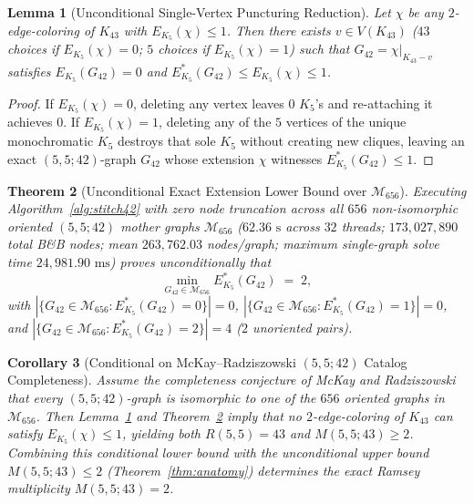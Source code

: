 \documentclass[11pt,a4paper]{article}
\theoremstyle{plain}
\newtheorem{theorem}{Theorem}[section]
\newtheorem{lemma}[theorem]{Lemma}
\newtheorem{corollary}[theorem]{Corollary}
\theoremstyle{definition}
\begin{document}
\begin{lemma}[Unconditional Single-Vertex Puncturing Reduction]\label{lem:puncture}
Let $\chi$ be any $2$-edge-coloring of $K_{43}$ with $E_{K_5}(\chi) \le 1$. Then there exists $v \in V(K_{43})$ ($43$ choices if $E_{K_5}(\chi) = 0$; $5$ choices if $E_{K_5}(\chi) = 1$) such that $G_{42} = \chi|_{K_{43} - v}$ satisfies $E_{K_5}(G_{42}) = 0$ and $E_{K_5}^*(G_{42}) \le E_{K_5}(\chi) \le 1$.
\end{lemma}
\begin{proof}
If $E_{K_5}(\chi) = 0$, deleting any vertex leaves $0$ $K_5$'s and re-attaching it achieves $0$. If $E_{K_5}(\chi) = 1$, deleting any of the $5$ vertices of the unique monochromatic $K_5$ destroys that sole $K_5$ without creating new cliques, leaving an exact $(5,5;42)$-graph $G_{42}$ whose extension $\chi$ witnesses $E_{K_5}^*(G_{42}) \le 1$.
\end{proof}

\begin{theorem}[Unconditional Exact Extension Lower Bound over $\mathcal{M}_{656}$]\label{thm:census-656}
Executing Algorithm~\ref{alg:stitch42} with zero node truncation across all $656$ non-isomorphic oriented $(5,5;42)$ mother graphs $\mathcal{M}_{656}$ ($62.36\text{ s}$ across $32$ threads; $173,027,890$ total B\&B nodes; mean $263,762.03$ nodes/graph; maximum single-graph solve time $24,981.90\text{ ms}$) proves unconditionally that
\begin{equation}\label{eq:min-656}
  \min_{G_{42} \in \mathcal{M}_{656}} E_{K_5}^*(G_{42}) \;=\; 2,
\end{equation}
with $|\{G_{42} \in \mathcal{M}_{656} : E_{K_5}^*(G_{42}) = 0\}| = 0$, $|\{G_{42} \in \mathcal{M}_{656} : E_{K_5}^*(G_{42}) = 1\}| = 0$, and $|\{G_{42} \in \mathcal{M}_{656} : E_{K_5}^*(G_{42}) = 2\}| = 4$ ($2$ unoriented pairs).
\end{theorem}

\begin{corollary}[Conditional on McKay--Radziszowski $(5,5;42)$ Catalog Completeness]\label{cor:conditional-m55}
Assume the completeness conjecture of McKay and Radziszowski~\cite{McKayRadziszowski1997} that every $(5,5;42)$-graph is isomorphic to one of the $656$ oriented graphs in $\mathcal{M}_{656}$. Then Lemma~\ref{lem:puncture} and Theorem~\ref{thm:census-656} imply that no $2$-edge-coloring of $K_{43}$ can satisfy $E_{K_5}(\chi) \le 1$, yielding both $R(5,5) = 43$ and $M(5,5;43) \ge 2$. Combining this conditional lower bound with the unconditional upper bound $M(5,5;43) \le 2$ (Theorem~\ref{thm:anatomy}) determines the exact Ramsey multiplicity $M(5,5;43) = 2$.
\end{corollary}
\end{document}
